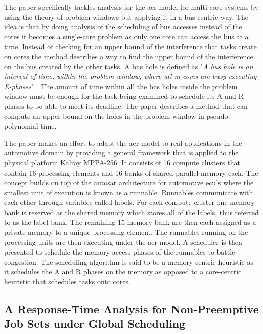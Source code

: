 \documentclass{kththesis}
\begin{document}
The paper \parencite{maia_schedulability_2017} specifically tackles analysis for the \acrshort{aer}
model for multi-core systems by using the theory of problem windows but applying it in a bus-centric
way. The idea is that by doing analysis of the scheduling of bus accesses instead of the cores it
becomes a single-core problem as only one core can access the bus at a time.  Instead of checking
for an upper bound of the interference that tasks create on cores the method describes a way to find
the upper bound of the interference on the bus created by the other tasks. A bus hole is defined as
"\textit{A bus hole is an interval of time, within the problem window, where all m cores are busy
executing E-phases}" \parencite{maia_schedulability_2017}. The amount of time within all the bus
holes inside the problem window must be enough for the task being examined to schedule its A and R
phases to be able to meet its deadline. The paper describes a method that can compute an upper bound
on the holes in the problem window in pseudo-polynomial time.

The paper \parencite{becker_contention-free_2016} makes an effort to adapt the \acrshort{aer} model
to real applications in the automotive domain by providing a general framework that is applied to
the physical platform Kalray MPPA-256. It consists of 16 compute clusters that contain 16 processing
elements and 16 banks of shared parallel memory each. The concept builds on top of the
\acrshort{autosar} architecture for automotive \acrshort{ecu}'s where the smallest unit of execution
is known as a runnable. Runnables communicate with each other through variables called labels. For
each compute cluster one memory bank is reserved as the shared memory which stores all of the
labels, thus referred to as the label bank. The remaining 15 memory bank are then each assigned as a
private memory to a unique processing element. The runnables running on the processing units are
then executing under the \acrshort{aer} model. A scheduler is then presented to schedule the memory
access phases of the runnables to battle congestion. The scheduling algorithm is said to be a
memory-centric heuristic as it schedules the A and R phases on the memory as opposed to a
core-centric heuristic that schedules tasks onto cores.


\subsection{A Response-Time Analysis for Non-Preemptive Job Sets under Global
Scheduling}\label{subsec:artafnpjsug}
\end{document}
